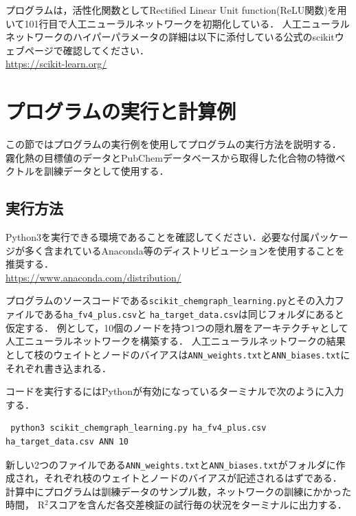 \documentclass[11pt,titlepage,dvipdfmx,twoside]{jarticle}
\begin{document}
プログラムは，活性化関数としてRectified Linear Unit function(ReLU関数)を用いて101行目で人工ニューラルネットワークを初期化している．
人工ニューラルネットワークのハイパーパラメータの詳細は以下に添付している公式のscikitウェブページで確認してください．
\\

\url{https://scikit-learn.org/}




\newpage

\section{プログラムの実行と計算例}
\label{sec:section5}

この節ではプログラムの実行例を使用してプログラムの実行方法を説明する．
霧化熱の目標値のデータとPubChemデータベースから取得した化合物の特徴ベクトルを訓練データとして使用する．

\subsection{実行方法}
\label{sec:section5_1}

Python3を実行できる環境であることを確認してください．必要な付属パッケージが多く含まれているAnaconda等のディストリビューションを使用することを推奨する．
\\
\url{https://www.anaconda.com/distribution/}

プログラムのソースコードである\verb|scikit_chemgraph_learning.py|とその入力ファイルである\verb|ha_fv4_plus.csv|と \verb|ha_target_data.csv|は同じフォルダにあると仮定する．
例として，10個のノードを持つ1つの隠れ層をアーキテクチャとして人工ニューラルネットワークを構築する．
人工ニューラルネットワークの結果として枝のウェイトとノードのバイアスは\verb|ANN_weights.txt|と\verb|ANN_biases.txt|にそれぞれ書き込まれる．

コードを実行するにはPythonが有効になっているターミナルで次のように入力する．
\begin{verbatim}
 python3 scikit_chemgraph_learning.py ha_fv4_plus.csv ha_target_data.csv ANN 10
\end{verbatim}

新しい2つのファイルである\verb|ANN_weights.txt|と\verb|ANN_biases.txt|がフォルダに作成され，それぞれ枝のウェイトとノードのバイアスが記述されるはずである．
計算中にプログラムは訓練データのサンプル数，ネットワークの訓練にかかった時間， R$^2$スコアを含んだ各交差検証の試行毎の状況をターミナルに出力する．
\end{document}
